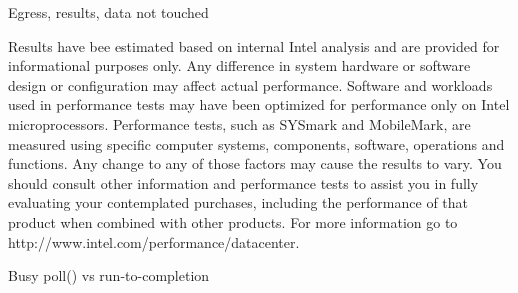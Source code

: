 \documentclass[aspectratio=169, xcolor=table]{beamer}
\begin{document}
  {%
  \begin{frame}{Egress, results, data not touched}
  \fontsize{3pt}{2pt}\selectfont
    \begin{center}\end{center}
  Results have bee estimated based on internal Intel analysis and are
  provided for informational purposes only. Any difference in system
  hardware or software design or configuration may affect actual
  performance. Software and workloads used in performance tests may
  have been optimized for performance only on Intel
  microprocessors. Performance tests, such as SYSmark and MobileMark,
  are measured using specific computer systems, components, software,
  operations and functions. Any change to any of those factors may
  cause the results to vary. You should consult other information and
  performance tests to assist you in fully evaluating your
  contemplated purchases, including the performance of that product
  when combined with other products. For more information go to
  http://www.intel.com/performance/datacenter.  
  \end{frame}
  }

  \begin{frame}{Busy poll() vs run-to-completion}
    \centering{}
  \end{frame}
\end{document}
